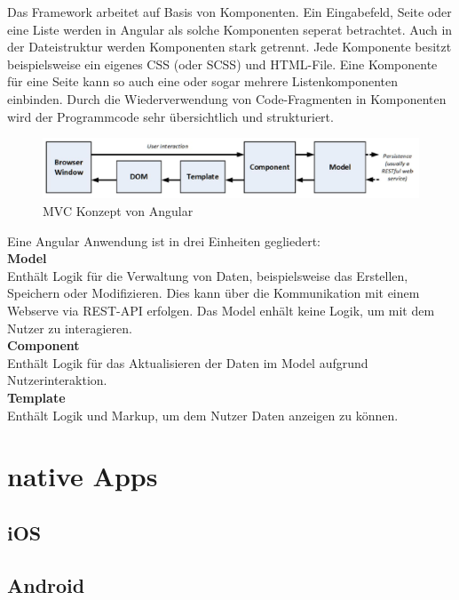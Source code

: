 Das Framework arbeitet auf Basis von Komponenten. Ein Eingabefeld, Seite oder eine Liste werden in Angular als solche Komponenten seperat betrachtet. Auch in der Dateistruktur werden Komponenten stark getrennt. Jede Komponente besitzt beispielsweise ein eigenes CSS (oder SCSS) und HTML-File. Eine Komponente für eine Seite kann so auch eine oder sogar mehrere Listenkomponenten einbinden. Durch die Wiederverwendung von Code-Fragmenten in Komponenten wird der Programmcode sehr übersichtlich und strukturiert.

\begin{figure}[h]
        \includegraphics[width=\linewidth]{img/Angular_MVC.JPG}
        \centering
        \caption{MVC Konzept von Angular \cite[S. 35, Abbildung 3-4]{ProAngular}}
        \label{fig:angularmvc}
\end{figure}

Eine Angular Anwendung ist in drei Einheiten gegliedert:\\

\textbf{Model}\\ 
Enthält Logik für die Verwaltung von Daten, beispielsweise das Erstellen, Speichern oder Modifizieren. Dies kann über die Kommunikation mit einem Webserve via REST-API erfolgen. Das Model enhält keine Logik, um mit dem Nutzer zu interagieren.\\

\textbf{Component}\\
Enthält Logik für das Aktualisieren der Daten im Model aufgrund Nutzerinteraktion. \\

\textbf{Template}\\ 
Enthält Logik und Markup, um dem Nutzer Daten anzeigen zu können.

\cite{ProAngular}

\section{native Apps}

\subsection{iOS}

\subsection{Android}

